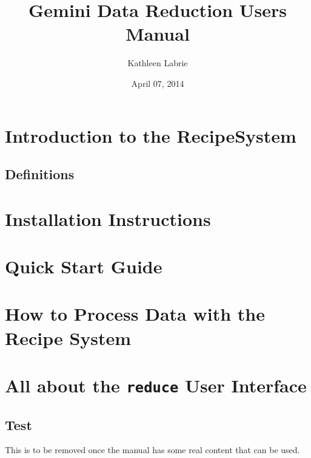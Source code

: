 \documentclass[letterpaper,10pt,english]{sphinxmanual}
\title{Gemini Data Reduction Users Manual}
\date{April 07, 2014}
\author{Kathleen Labrie}
\begin{document}
\maketitle
\tableofcontents
{}\label{index-latex::doc}



\chapter{Introduction to the RecipeSystem}
\label{RecipeSystem/intro:introduction-to-the-recipesystem}\label{RecipeSystem/intro:gemini-data-reduction-users-manual}\label{RecipeSystem/intro::doc}

\section{Definitions}
\label{RecipeSystem/intro:definitions}

\chapter{Installation Instructions}
\label{RecipeSystem/installation::doc}\label{RecipeSystem/installation:installation-instructions}

\chapter{Quick Start Guide}
\label{RecipeSystem/quickstart:quick-start-guide}\label{RecipeSystem/quickstart::doc}

\chapter{How to Process Data with the Recipe System}
\label{RecipeSystem/usage::doc}\label{RecipeSystem/usage:how-to-process-data-with-the-recipe-system}

\chapter{All about the  \texttt{reduce} User Interface}
\label{RecipeSystem/reduce:all-about-the-reduce-user-interface}\label{RecipeSystem/reduce::doc}

\section{Test}
\label{RecipeSystem/test:test}\label{RecipeSystem/test::doc}
This is to be removed once the  manual has some real content that can be used.
\end{document}
